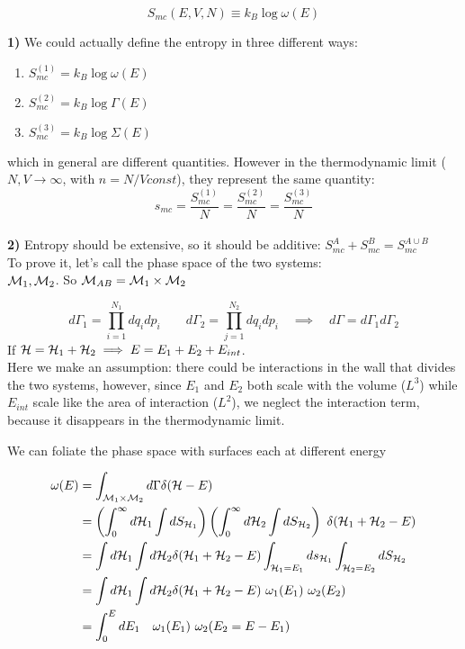 $$ S_{mc} (E,V,N) \equiv k_B \log \omega(E)$$

\textbf{1)} We could actually define the entropy in three different ways:
\begin{enumerate}
    \item $S_{mc}^{(1)} = k_B \log \omega(E)$
    \item $S_{mc}^{(2)} = k_B \log \Gamma(E)$
    \item $S_{mc}^{(3)} = k_B \log \Sigma(E)$
\end{enumerate}
which in general are different quantities. However in the thermodynamic limit ($N,V \to \infty$, with $n= N/V const$), they represent the same quantity: 
$$s_{mc} = \frac{S_{mc}^{(1)}}N = \frac{S_{mc}^{(2)}}N = \frac{S_{mc}^{(3)}}N$$
\\

\textbf{2)} Entropy should be extensive, so it should be additive: $ S_{mc}^A + S_{mc}^B = S_{mc}^{A\cup B}$\\

\Pf To prove it, let's call the phase space of the two systems: \\$\mathcal{M}_1, \mathcal{M}_2$. So $\mathcal{M}_{AB} = \mathcal{M}_1 \times \mathcal{M}_2$

$$ d\Gamma_1 = \prod_{i=1}^{N_1} dq_idp_i \qquad d\Gamma_2 = \prod_{j=1}^{N_2} dq_idp_i \quad \implies \quad d\Gamma = d\Gamma_1 d\Gamma_2$$
If $\mathcal{H} = \mathcal{H}_1 + \mathcal{H}_2 \implies E = E_1 + E_2 + E_{int}$.\\
Here we make an assumption: there could be interactions in the wall that divides the two systems, however, since $E_1$ and $E_2$ both scale with the volume ($L^3$) while $E_{int}$ scale like the area of interaction ($L^2$), we neglect the interaction term, because it disappears in the thermodynamic limit.

We can foliate the phase space with surfaces each at different energy


\begin{align*}
\omega (E) &= \int_{\ps_1 \times \ps_2} d\Gamma \delta(\ham - E)\\
&=\left(\int_0^\infty d\ham_1 \int dS_{\ham_1}\right) \left(\int_0^\infty d\ham_2 \int dS_{\ham_2}\right) \ \delta(\ham_1 + \ham_2 - E)\\
&= \int d\ham_1 \int d\ham_2 \delta(\ham_1 + \ham_2 - E) \int_{\ham_1=E_1} d s_{\ham_1} \int_{\ham_2 = E_2} dS_{\ham_2} \\
&= \int d\ham_1 \int d\ham_2 \delta (\ham_1+\ham_2 -E) \ \omega_1(E_1) \ \omega_2(E_2) \\
&= \int_0^E dE_1 \quad \omega_1(E_1) \ \omega_2(E_2=E-E_1)
\end{align*}

